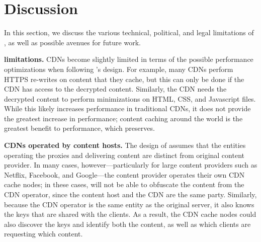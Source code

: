\section{Discussion}
\label{sec:discussion}
In this section, we discuss the various technical, political, and legal limitations
of \system{}, as well as possible avenues for future work. 

\textbf{\system{} limitations.} CDNs become slightly limited in terms of the 
possible performance optimizations when following \system{}'s design.  For example, 
many CDNs perform HTTPS re-writes on content that they cache, but this can only be 
done if the CDN has access to the decrypted content.  Similarly, the CDN needs the 
decrypted content to perform minimizations on HTML, CSS, and Javascript files.  While 
this likely increases performance in traditional CDNs, it does not provide the greatest 
increase in performance; content caching around the world is the greatest benefit to 
performance, which \system{} preserves.

\textbf{CDNs operated by content hosts.} The design of \system{}
assumes that the entities operating the proxies and delivering content are
distinct from original content provider. In many cases, however---particularly
for large content providers such as Netflix, Facebook, and Google---the
content provider operates their own CDN cache nodes; in these cases, \system{} will
not be able to obfuscate the content from the CDN operator, since the content host
and the CDN are the same party.  Similarly, because the CDN operator is the same
entity as the original server, it also knows the keys that are shared with the clients.
As a result, the CDN cache nodes could also discover the keys and identify both
the content, as well as which clients are requesting which content.


